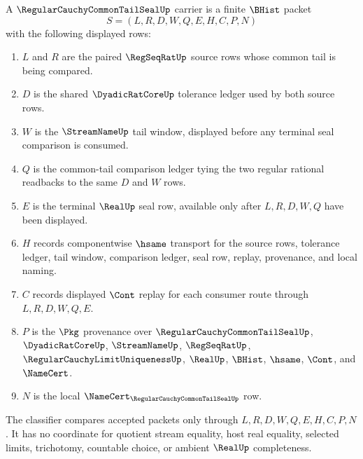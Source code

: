 \begin{definition}
\label{def:regular-cauchy-common-tail-seal-carrier}
A $\RegularCauchyCommonTailSealUp$ carrier is a finite $\BHist$ packet
$$
S=(L,R,D,W,Q,E,H,C,P,N)
$$
with the following displayed rows:
\begin{enumerate}
\item $L$ and $R$ are the paired $\RegSeqRatUp$ source rows whose common tail is being compared.
\item $D$ is the shared $\DyadicRatCoreUp$ tolerance ledger used by both source rows.
\item $W$ is the $\StreamNameUp$ tail window, displayed before any terminal seal comparison is consumed.
\item $Q$ is the common-tail comparison ledger tying the two regular rational readbacks to the same $D$ and $W$ rows.
\item $E$ is the terminal $\RealUp$ seal row, available only after $L,R,D,W,Q$ have been displayed.
\item $H$ records componentwise $\hsame$ transport for the source rows, tolerance ledger, tail window, comparison ledger, seal row, replay, provenance, and local naming.
\item $C$ records displayed $\Cont$ replay for each consumer route through $L,R,D,W,Q,E$.
\item $P$ is the $\Pkg$ provenance over $\RegularCauchyCommonTailSealUp$, $\DyadicRatCoreUp$, $\StreamNameUp$, $\RegSeqRatUp$, $\RegularCauchyLimitUniquenessUp$, $\RealUp$, $\BHist$, $\hsame$, $\Cont$, and $\NameCert$.
\item $N$ is the local $\NameCert_{\RegularCauchyCommonTailSealUp}$ row.
\end{enumerate}
The classifier compares accepted packets only through $L,R,D,W,Q,E,H,C,P,N$. It has no coordinate for quotient stream equality, host real equality, selected limits, trichotomy, countable choice, or ambient $\RealUp$ completeness.
\end{definition}

